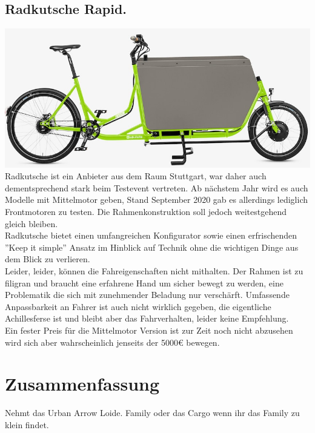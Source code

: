 \documentclass[a4paper,ngerman, 14pt] {scrartcl}
\begin{document}
\subsection{Radkutsche Rapid.}
\includegraphics[scale=0.64]{radkutsche_rapid.png}\\
Radkutsche ist ein Anbieter aus dem Raum Stuttgart, war daher auch dementsprechend stark beim Testevent vertreten. Ab nächstem Jahr wird es auch Modelle mit Mittelmotor geben, Stand September 2020 gab es allerdings lediglich Frontmotoren zu testen. Die Rahmenkonstruktion soll jedoch weitestgehend gleich bleiben.\\
Radkutsche bietet einen umfangreichen Konfigurator sowie einen erfrischenden ''Keep it simple'' Ansatz im Hinblick auf Technik ohne die wichtigen Dinge aus dem Blick zu verlieren.\\
Leider, leider, können die Fahreigenschaften nicht mithalten. Der Rahmen ist zu filigran und braucht eine erfahrene Hand um sicher bewegt zu werden, eine Problematik die sich mit zunehmender Beladung nur verschärft. Umfassende Anpassbarkeit an Fahrer ist auch nicht wirklich gegeben, die eigentliche Achillesferse ist und bleibt aber das Fahrverhalten, leider keine Empfehlung.\\
Ein fester Preis für die Mittelmotor Version ist zur Zeit noch nicht abzusehen wird sich aber wahrscheinlich jenseits der 5000€ bewegen.
\newpage


\section{Zusammenfassung}
Nehmt das Urban Arrow Loide. Family oder das Cargo wenn ihr das Family zu klein findet.
\end{document}
